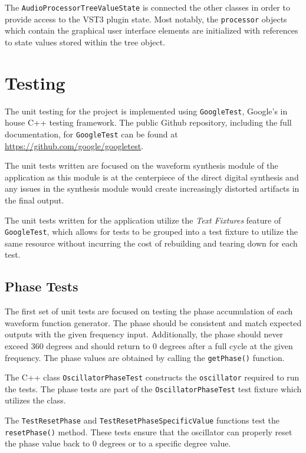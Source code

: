 \documentclass[a4paper,12pt]{report}
\begin{document}
The \texttt{Audio\-Processor\-Tree\-Value\-State} is connected the other classes in order to provide access to the VST3 plugin state. Most notably, the \texttt{processor} objects which contain the graphical user interface elements are initialized with references to state values stored within the tree object.

\section{Testing}
\label{sec:testing}
The unit testing for the project is implemented using \texttt{Google\-Test}, Google's in house C++ testing framework. The public Github repository, including the full documentation, for \texttt{Google\-Test} can be found at \href{https://github.com/google/googletest}{https://github.com/google/googletest}.

The unit tests written are focused on the waveform synthesis module of the application as this module is at the centerpiece of the direct digital synthesis and any issues in the synthesis module would create increasingly distorted artifacts in the final output.

The unit tests written for the application utilize the \emph{Text Fixtures} feature of \texttt{Google\-Test}, which allows for tests to be grouped into a test fixture to utilize the same resource without incurring the cost of rebuilding and tearing down for each test. 

\subsection{Phase Tests}
\label{subsec:phasetests}
The first set of unit tests are focused on testing the phase accumulation of each waveform function generator. The phase should be consistent and match expected outputs with the given frequency input. Additionally, the phase should never exceed 360 degrees and should return to 0 degrees after a full cycle at the given frequency. The phase values are obtained by calling the \texttt{getPhase()} function.

The C++ class \texttt{Oscillator\-Phase\-Test} constructs the \texttt{oscillator} required to run the tests. The phase tests are part of the \texttt{Oscillator\-Phase\-Test} test fixture which utilizes the class.

The \texttt{Test\-Reset\-Phase} and \texttt{Test\-Reset\-Phase\-Specific\-Value} functions test the \texttt{reset\-Phase()} method. These tests ensure that the oscillator can properly reset the phase value back to 0 degrees or to a specific degree value.
\end{document}
